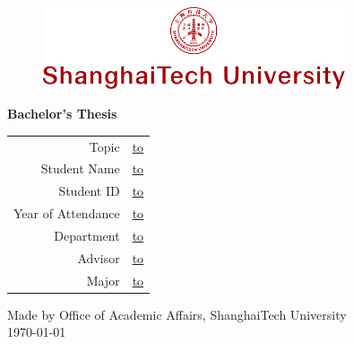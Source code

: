 \thispagestyle{titlepage}

\begin{figure}[!htb]
  \begin{center}
    \includegraphics[width=0.7945\textwidth]{style/img/emblem_vstack_en.pdf} %
  \end{center}
\end{figure}

\vspace{1cm}
\begin{center}
\Huge\sffamily\textbf{Bachelor's Thesis}
\end{center}
\vfill

\vspace{3cm}

{\def\arraystretch{1.5}
\makeatletter
  \begin{tabular}{Cc}
  Topic&
  \underline{\hbox to \@metaBlankLen{\hfill\@title\hfill}} \\
  Student Name&
  \underline{\hbox to \@metaBlankLen{\hfill\@studentNameEn\hfill}} \\
  Student ID&
  \underline{\hbox to \@metaBlankLen{\hfill\@studentId\hfill}} \\
  Year of Attendance&
  \underline{\hbox to \@metaBlankLen{\hfill\@yearOfAttendance\hfill}} \\
  Department&
  \underline{\hbox to \@metaBlankLen{\hfill\@departmentNameEn\hfill}} \\
  Advisor&
  \underline{\hbox to \@metaBlankLen{\hfill\@advisorNameEn\hfill}} \\
  Major&
  \underline{\hbox to \@metaBlankLen{\hfill\@majorNameEn\hfill}} \\
  \end{tabular}
\makeatother}

\vfill

\begin{center}
Made by Office of Academic Affairs, ShanghaiTech University\\
\today
\end{center}

\cleardoublepage

